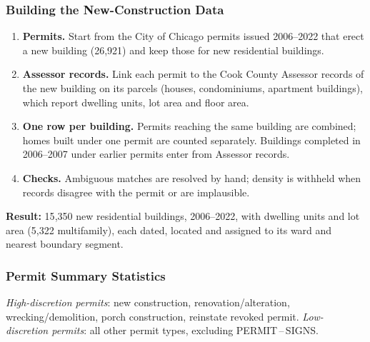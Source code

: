 \begin{frame}[label=construction-data-appendix]
    \frametitle{Building the New-Construction Data}
    \small
    \begin{enumerate}[itemsep=0.55em]
      \item \textbf{Permits.} Start from the City of Chicago permits issued 2006--2022 that erect a new building (26{,}921) and keep those for new residential buildings.
      \item \textbf{Assessor records.} Link each permit to the Cook County Assessor records of the new building on its parcels (houses, condominiums, apartment buildings), which report dwelling units, lot area and floor area.
      \item \textbf{One row per building.} Permits reaching the same building are combined; homes built under one permit are counted separately. Buildings completed in 2006--2007 under earlier permits enter from Assessor records.
      \item \textbf{Checks.} Ambiguous matches are resolved by hand; density is withheld when records disagree with the permit or are implausible.
    \end{enumerate}
    \medskip
    \textbf{Result:} 15{,}350 new residential buildings, 2006--2022, with dwelling units and lot area (5{,}322 multifamily), each dated, located and assigned to its ward and nearest boundary segment.
    \vfill\hfill\hyperlink{data-main}{}
\end{frame}


\begin{frame}[label=permit-summary-stats-appendix]
    \frametitle{Permit Summary Statistics}
    \begin{center}
    \small
    \setlength{\tabcolsep}{4pt}
    \renewcommand{\arraystretch}{1.0}
    
    \end{center}
    \vspace{0.4em}
    {\footnotesize \textit{High-discretion permits}: new construction, renovation/alteration, wrecking/demolition, porch construction, reinstate revoked permit. \textit{Low-discretion permits}: all other permit types, excluding PERMIT\,--\,SIGNS.}
    \vfill
    \hfill\hyperlink{permit-stats-main}{}
\end{frame}

